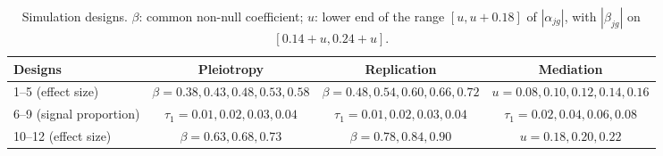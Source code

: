 \begin{table}[htbp]
\centering
\caption{Simulation designs. $\beta$: common non-null coefficient; $u$: lower end of the range $[u,u+0.18]$ of $|\alpha_{jg}|$, with $|\beta_{jg}|$ on $[0.14+u,0.24+u]$.}\label{tab:sim-designs}
\footnotesize
\begin{tabular}{@{}lccc@{}}
\toprule
Designs & Pleiotropy & Replication & Mediation\\
\midrule
1--5 (effect size) & $\beta=0.38,0.43,0.48,0.53,0.58$ & $\beta=0.48,0.54,0.60,0.66,0.72$ & $u=0.08,0.10,0.12,0.14,0.16$\\
6--9 (signal proportion) & $\tau_1=0.01,0.02,0.03,0.04$ & $\tau_1=0.01,0.02,0.03,0.04$ & $\tau_1=0.02,0.04,0.06,0.08$\\
10--12 (effect size) & $\beta=0.63,0.68,0.73$ & $\beta=0.78,0.84,0.90$ & $u=0.18,0.20,0.22$\\
\bottomrule
\end{tabular}
\end{table}

